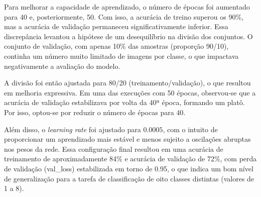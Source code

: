 Para melhorar a capacidade de aprendizado, o número de épocas foi aumentado para 40 e, posteriormente, 
50. Com isso, a acurácia de treino superou os 90\%, mas a acurácia de validação permaneceu 
significativamente inferior. Essa discrepância levantou a hipótese de um desequilíbrio na divisão dos 
conjuntos. O conjunto de validação, com apenas 10\% das amostras (proporção 90/10), continha um número 
muito limitado de imagens por classe, o que impactava negativamente a avaliação do modelo.

A divisão foi então ajustada para 80/20 (treinamento/validação), o que resultou em melhoria 
expressiva. Em uma das execuções com 50 épocas, observou-se que a acurácia de validação estabilizava 
por volta da 40ª época, formando um platô. Por isso, optou-se por reduzir o número de épocas para 40.

Além disso, o \textit{learning rate} foi ajustado para $0.0005$, com o intuito de proporcionar um 
aprendizado mais estável e menos sujeito a oscilações abruptas nos pesos da rede. Essa configuração 
final resultou em uma acurácia de treinamento de aproximadamente 84\% e acurácia de validação de 72\%, 
com perda de validação (val\_loss) estabilizada em torno de 0.95, o que indica um bom nível de generalização 
para a tarefa de classificação de oito classes distintas (valores de 1 a 8).

